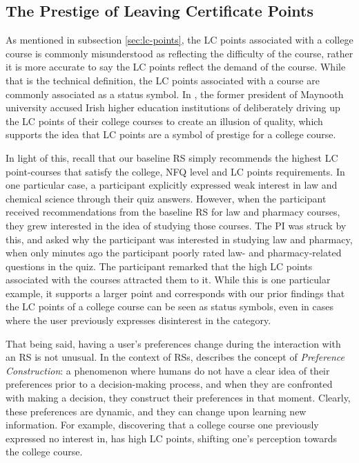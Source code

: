 \subsection{The Prestige of Leaving Certificate Points}

As mentioned in subsection \ref{sec:lc-points}, the LC points associated with a college course is commonly misunderstood as 
reflecting the difficulty of the course, rather it is more accurate to say the LC points reflect the demand of the course.
While that is the technical definition, the LC points associated with a course are commonly associated as a status symbol.
In \cite{okelley2026professor}, the former president of Maynooth university accused Irish higher education institutions of 
deliberately driving up the LC points of their college courses to create an illusion of quality,
which supports the idea that LC points are a symbol of prestige for a college course.

In light of this, recall that our baseline RS simply recommends the highest LC point-courses that satisfy the college, NFQ level and LC points requirements.
In one particular case, a participant explicitly expressed weak interest in law and chemical science through their quiz answers.
However, when the participant received recommendations from the baseline RS for law and pharmacy courses,
they grew interested in the idea of studying those courses.
The PI was struck by this, and asked why the participant was interested in studying law and pharmacy,
when only minutes ago the participant poorly rated law- and pharmacy-related questions in the quiz.
The participant remarked that the high LC points associated with the courses attracted them to it.
While this is one particular example, it supports a larger point and corresponds with our prior findings
that the LC points of a college course can be seen as status symbols, even in cases where the user previously expresses 
disinterest in the category.

That being said, having a user's preferences change during the interaction with an RS is not unusual.
In the context of RSs, \cite{chen2013human} describes the concept of \emph{Preference Construction}:
a phenomenon where humans do not have a clear idea of their preferences prior to a decision-making process, 
and when they are confronted with making a decision, they construct their preferences in that moment.
Clearly, these preferences are dynamic, and they can change upon learning new information.
For example, discovering that a college course one previously expressed no interest in,
has high LC points, shifting one's perception towards the college course.

